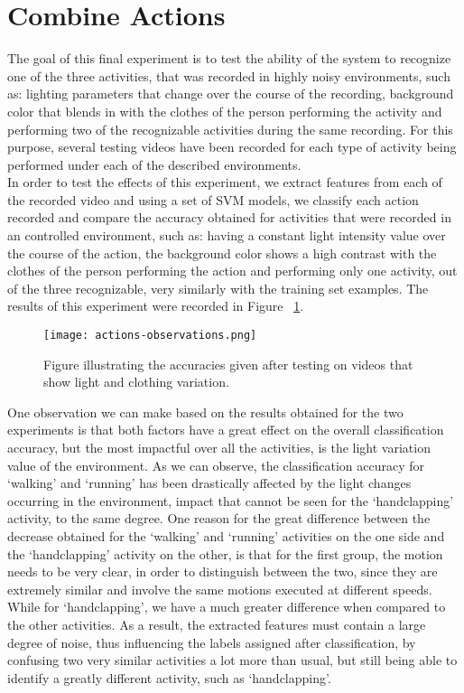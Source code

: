 \documentclass[11pt]{report}
\begin{document}
\section{Combine Actions}
The goal of this final experiment is to test the ability of the system to recognize one of the three activities, that was recorded in highly noisy environments, such as: lighting parameters that change over the course of the recording, background color that blends in with the clothes of the person performing the activity and performing two of the recognizable activities during the same recording. For this purpose, several testing videos have been recorded for each type of activity being performed under each of the described environments. \\
In order to test the effects of this experiment, we extract features from each of the recorded video and using a set of SVM models, we classify each action recorded and compare the accuracy obtained for activities that were recorded in an controlled environment, such as: having a constant light intensity value over the course of the action, the background color shows a high contrast with the clothes of the person performing the action and performing only one activity, out of the three recognizable, very similarly with the training set examples. The results of this experiment were recorded in Figure ~\ref{fig:actions-observations}.\\
\begin{figure}
    \centering
    \texttt{[image: actions-observations.png]}
    \caption{Figure illustrating the accuracies given after testing on videos that show light and clothing variation.}
    \label{fig:actions-observations}
\end{figure}
One observation we can make based on the results obtained for the two experiments is that both factors have a great effect on the overall classification accuracy, but the most impactful over all the activities, is the light variation value of the environment. As we can observe, the classification accuracy for `walking' and `running' has been drastically affected by the light changes occurring in the environment, impact that cannot be seen for the `handclapping' activity, to the same degree. One reason for the great difference between the decrease obtained for the `walking' and `running' activities on the one side and the `handclapping' activity on the other, is that for the first group, the motion needs to be very clear, in order to distinguish between the two, since they are extremely similar and involve the same motions executed at different speeds. While for `handclapping', we have a much greater difference when compared to the other activities. As a result, the extracted features must contain a large degree of noise, thus influencing the labels assigned after classification, by confusing two very similar activities a lot more than usual, but still being able to identify a greatly different activity, such as `handclapping'.\\
\end{document}
